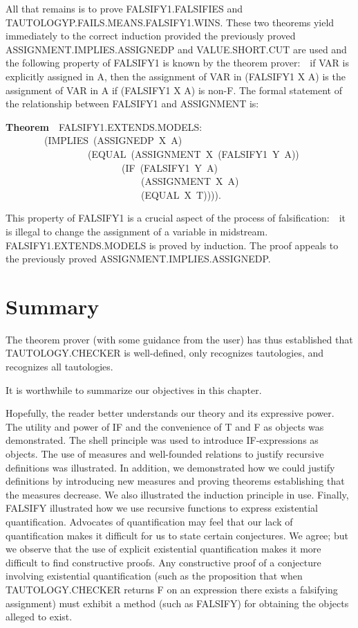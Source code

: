 \documentclass[10pt]{book}
\newenvironment{pubasis}{\begin{flushleft}}{\end{flushleft}}
\newcommand{\axiomordefinition}[1]{\vspace{6pt}\Large\textsf{\textbf{#1}}\normalsize}
\begin{document}
All that remains is to prove FALSIFY1.FALSIFIES
and TAUTOLOGYP.FAILS.MEANS.FALSIFY1.WINS.  These two theorems
yield immediately to the correct induction provided the previously
proved ASSIGNMENT.IMPLIES.ASSIGNEDP and VALUE.SHORT.CUT are used and
the following property of FALSIFY1 is known by the theorem prover:~~if VAR is explicitly assigned in A, then the
assignment of VAR in (FALSIFY1 X A) is the assignment of VAR in
A if (FALSIFY1 X A) is non-F.
The formal statement of the relationship between FALSIFY1 and ASSIGNMENT
is:
\begin{pubasis}
\axiomordefinition{Theorem}~~FALSIFY1.EXTENDS.MODELS:\\
~~~~~~~~(IMPLIES~(ASSIGNEDP~X~A)\\
~~~~~~~~~~~~~~~~~(EQUAL~(ASSIGNMENT~X~(FALSIFY1~Y~A))\\
~~~~~~~~~~~~~~~~~~~~~~~~(IF~(FALSIFY1~Y~A)\\
~~~~~~~~~~~~~~~~~~~~~~~~~~~~(ASSIGNMENT~X~A)\\
~~~~~~~~~~~~~~~~~~~~~~~~~~~~(EQUAL~X~T)))).\\
\end{pubasis}
This property of FALSIFY1 is a crucial aspect of the process of
falsification:~~it is illegal to change the assignment of a
variable in midstream.  FALSIFY1.EXTENDS.MODELS is proved by induction.
The proof appeals to the previously proved ASSIGNMENT.IMPLIES.ASSIGNEDP.

\section{Summary}
The theorem prover (with some guidance from the user) has
thus established that TAUTOLOGY.CHECKER is well-defined, only recognizes
tautologies, and recognizes all tautologies.

It is worthwhile to summarize our objectives in this chapter.

Hopefully, the reader better understands our theory and 
its expressive power.  The utility and power of IF
and the convenience of T and F as objects was demonstrated.
The shell principle was used to introduce IF-expressions as objects.  The use of measures
and well-founded relations to justify recursive definitions was illustrated.
In addition, we demonstrated how we could justify definitions by introducing
new measures and proving theorems establishing that the measures decrease.
We also illustrated the induction principle in use.
Finally, FALSIFY illustrated
how we use recursive functions to express existential quantification.
Advocates of quantification may feel that our lack of quantification makes
it difficult for us to state certain conjectures.  We agree; but we
observe that the use of explicit existential quantification
makes it more difficult to find constructive proofs.  Any constructive
proof of a conjecture involving existential quantification (such as the
proposition that when TAUTOLOGY.CHECKER returns F on an
expression there exists a falsifying assignment)
must exhibit a method (such as FALSIFY)
for obtaining the objects alleged to exist.
\end{document}
